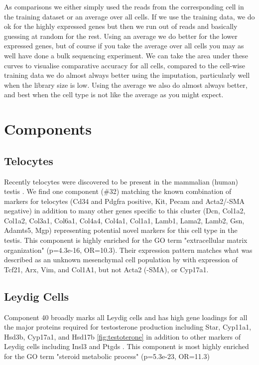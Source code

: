 As comparisons we either simply used the reads from the corresponding cell in the training dataset or an average over all cells. If we use the training data, we do ok for the highly expressed genes but then we run out of reads and basically guessing at random for the rest. Using an average we do better for the lower expressed genes, but of course if you take the average over all cells you may as well have done a bulk sequencing experiment. We can take the area under these curves to visualise comparative accuracy for all cells, compared to the cell-wise training data we do almost always better using the imputation, particularly well when the library size is low. Using the average we also do almost always better, and best when the cell type is not like the average as you might expect.


\section{Components}

\subsection{Telocytes}
Recently telocytes were discovered to be present in the mammalian (human) testis \parencite{Marini2018Reappraising, Kuroda2004Distribution}. We find one component (\#32) matching the known combination of markers for telocytes (Cd34 and Pdgfra positive, Kit, Pecam and Acta2/\textalpha-SMA negative) in addition to many other genes specific to this cluster (Dcn, Col1a2, Col1a2, Col3a1, Col6a1, Col4a4, Col4a1, Col1a1, Lamb1, Lama2, Lamb2, Gsn, Adamts5, Mgp) representing potential novel markers for this cell type in the testis. This component is highly enriched for the GO term "extracellular matrix organization" (p=4.3e-16, OR=10.3). Their expression pattern matches what was described as an unknown mesenchymal cell population by \cite{Green2018Comprehensive} with expression of Tcf21, Arx, Vim, and Col1A1, but not Acta2 (\textalpha-SMA), or Cyp17a1.


\subsection{Leydig Cells}
Component 40 broadly marks all Leydig cells and has high gene loadings for all the major proteins required for testosterone production including Star, Cyp11a1, Hsd3b, Cyp17a1, and Hsd17b \ref{fig:testoterone} \cite{Stojkov2013Orally} in addition to other markers of Leydig cells including Insl3 and Ptgds \parencite{Balvers1998RelaxinLike, Baker2001Expression}. This component is most highly enriched for the GO term "steroid metabolic process" (p=5.3e-23, OR=11.3)

